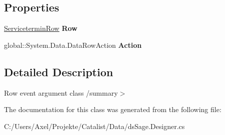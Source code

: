 \subsection*{Properties}
\begin{DoxyCompactItemize}
\item 
\hyperlink{class_products_1_1_data_1_1ds_sage_1_1_servicetermin_row}{Servicetermin\+Row} {\bfseries Row}\hypertarget{class_products_1_1_data_1_1ds_sage_1_1_servicetermin_row_change_event_ad91356ff6980310f592342e48948d4d5}{}\label{class_products_1_1_data_1_1ds_sage_1_1_servicetermin_row_change_event_ad91356ff6980310f592342e48948d4d5}

\item 
global\+::\+System.\+Data.\+Data\+Row\+Action {\bfseries Action}\hypertarget{class_products_1_1_data_1_1ds_sage_1_1_servicetermin_row_change_event_a21854612fdf67ba336cb1d8c8b6f1f05}{}\label{class_products_1_1_data_1_1ds_sage_1_1_servicetermin_row_change_event_a21854612fdf67ba336cb1d8c8b6f1f05}

\end{DoxyCompactItemize}


\subsection{Detailed Description}
Row event argument class /summary$>$ 

The documentation for this class was generated from the following file\+:\begin{DoxyCompactItemize}
\item 
C\+:/\+Users/\+Axel/\+Projekte/\+Catalist/\+Data/ds\+Sage.\+Designer.\+cs\end{DoxyCompactItemize}
